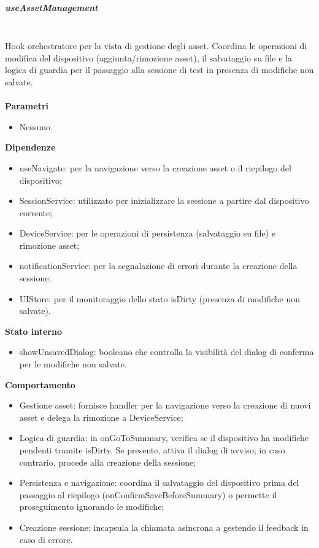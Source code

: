 \documentclass[a4paper,12pt]{article}
\begin{document}
                \subparagraph{useAssetManagement}\mbox{}\\
                Hook orchestratore per la vista di gestione degli asset. Coordina le operazioni di modifica del dispositivo (aggiunta/rimozione asset), il salvataggio su file e la logica di guardia per il passaggio alla sessione di test in presenza di modifiche non salvate.\\\\
                \textbf{Parametri}
                \begin{itemize}
                    \item Nessuno.
                \end{itemize}
                \textbf{Dipendenze}
                \begin{itemize}
                    \item {\ttfamily useNavigate}: per la navigazione verso la creazione asset o il riepilogo del dispositivo;
                    \item {\ttfamily SessionService}: utilizzato per inizializzare la sessione a partire dal dispositivo corrente;
                    \item {\ttfamily DeviceService}: per le operazioni di persistenza (salvataggio su file) e rimozione asset;
                    \item {\ttfamily notificationService}: per la segnalazione di errori durante la creazione della sessione;
                    \item {\ttfamily UIStore}: per il monitoraggio dello stato {\ttfamily isDirty} (presenza di modifiche non salvate).
                \end{itemize}
                \textbf{Stato interno}
                \begin{itemize}
                    \item {\ttfamily showUnsavedDialog}: booleano che controlla la visibilità del dialog di conferma per le modifiche non salvate.
                \end{itemize}
                \textbf{Comportamento}
                \begin{itemize}
                    \item Gestione asset: fornisce handler per la navigazione verso la creazione di nuovi asset e delega la rimozione a {\ttfamily DeviceService};
                    \item Logica di guardia: in {\ttfamily onGoToSummary}, verifica se il dispositivo ha modifiche pendenti tramite {\ttfamily isDirty}. Se presente, attiva il dialog di avviso; in caso contrario, procede alla creazione della sessione;
                    \item Persistenza e navigazione: coordina il salvataggio del dispositivo prima del passaggio al riepilogo ({\ttfamily onConfirmSaveBeforeSummary}) o permette il proseguimento ignorando le modifiche;
                    \item Creazione sessione: incapsula la chiamata asincrona a  gestendo il feedback in caso di errore.
                \end{itemize}
\end{document}
